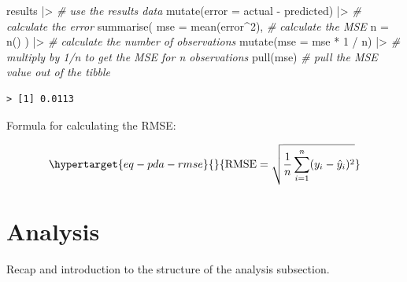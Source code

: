 \documentclass[
  letterpaper,
]{latex/krantz}
\newenvironment{Shaded}{\begin{snugshade}}{\end{snugshade}}
\newcommand{\AttributeTok}[1]{\textcolor[rgb]{0.00,0.00,0.00}{#1}}
\newcommand{\CommentTok}[1]{\textcolor[rgb]{0.00,0.00,0.00}{\textit{#1}}}
\newcommand{\DecValTok}[1]{\textcolor[rgb]{0.00,0.00,0.00}{#1}}
\newcommand{\FunctionTok}[1]{\textcolor[rgb]{0.00,0.00,0.00}{#1}}
\newcommand{\NormalTok}[1]{\textcolor[rgb]{0.00,0.00,0.00}{#1}}
\newcommand{\SpecialCharTok}[1]{\textcolor[rgb]{0.00,0.00,0.00}{#1}}
\begin{document}
\begin{Shaded}
\begin{Highlighting}[]
\NormalTok{results }\SpecialCharTok{|\textgreater{}} \CommentTok{\# use the \textasciigrave{}results\textasciigrave{} data}
  \FunctionTok{mutate}\NormalTok{(}\AttributeTok{error =}\NormalTok{ actual }\SpecialCharTok{{-}}\NormalTok{ predicted) }\SpecialCharTok{|\textgreater{}} \CommentTok{\# calculate the error}
  \FunctionTok{summarise}\NormalTok{(}
    \AttributeTok{mse =} \FunctionTok{mean}\NormalTok{(error}\SpecialCharTok{\^{}}\DecValTok{2}\NormalTok{), }\CommentTok{\# calculate the MSE}
    \AttributeTok{n =} \FunctionTok{n}\NormalTok{()}
\NormalTok{  ) }\SpecialCharTok{|\textgreater{}} \CommentTok{\# calculate the number of observations}
  \FunctionTok{mutate}\NormalTok{(}\AttributeTok{mse =}\NormalTok{ mse }\SpecialCharTok{*} \DecValTok{1} \SpecialCharTok{/}\NormalTok{ n) }\SpecialCharTok{|\textgreater{}} \CommentTok{\# multiply by 1/n to get the MSE for n observations}
  \FunctionTok{pull}\NormalTok{(mse) }\CommentTok{\# pull the MSE value out of the tibble}
\end{Highlighting}
\end{Shaded}

\begin{verbatim}
> [1] 0.0113
\end{verbatim}

Formula for calculating the RMSE:

\begin{equation}\protect\hypertarget{eq-pda-rmse}{}{
\text{RMSE} = \sqrt{\frac{1}{n} \sum_{i=1}^{n} (y_i - \hat{y}_i)^2}
}\label{eq-pda-rmse}\end{equation}

\hypertarget{pda-analysis}{%
\section{Analysis}\label{pda-analysis}}

Recap and introduction to the structure of the analysis subsection.
\end{document}
